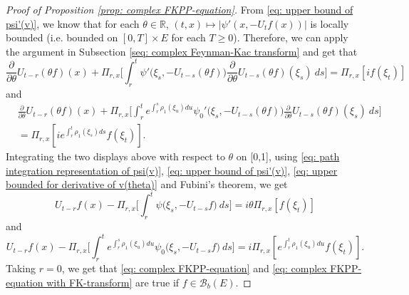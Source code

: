 \documentclass[12pt,a4paper]{amsart}
\theoremstyle{plain}
\theoremstyle{definition}
\numberwithin{equation}{section}
\begin{document}
\begin{proof}[Proof of Proposition \ref{prop: complex FKPP-equation}]
    From \eqref{eq: upper bound of psi'(v)}, we know that for each $\theta\in \mathbb R$, $(t,x) \mapsto |\psi'(x,-U_tf(x))|$ is locally bounded (i.e. bounded on $[0,T]\times E$ for each $T \geq 0$).
    Therefore, we can apply the argument in Subsection \ref{seq: complex Feynman-Kac transform} and get that
\[
    \frac{\partial}{\partial \theta} U_{t-r}(\theta f)(x) + \Pi_{r,x} \Big[\int_r^t \psi'\big(\xi_s,- U_{t-s}(\theta f)\big)\frac{\partial}{\partial \theta} U_{t-s}(\theta f)(\xi_s)~ds\Big]
    = \Pi_{r,x} [i f(\xi_t)]
\]
    and
\begin{equation}\begin{split}
    &\frac{\partial}{\partial \theta} U_{t-r}(\theta f)(x) + \Pi_{r,x} \Big[\int_r^t e^{\int_r^s \rho_1(\xi_u)du}\psi_0'\big(\xi_s,- U_{t-s}(\theta f)\big)\frac{\partial}{\partial \theta} U_{t-s}(\theta f)(\xi_s)~ds\Big]\\
    &= \Pi_{r,x} [i e^{\int_r^t \rho_1(\xi_s)ds}f(\xi_t)].
\end{split}\end{equation}
    Integrating the two displays above with respect to $\theta$  on [0,1], using \eqref{eq: path integration representation of psi(v)}, \eqref{eq: upper bound of psi'(v)}, \eqref{eq: upper bounded for derivative of v(theta)} and Fubini's theorem, we get
\begin{equation}
    U_{t-r}f(x) - \Pi_{r,x} \Big[\int_r^t \psi\big(\xi_s,-U_{t-s}f\big) ~ds\Big]
    = i\theta \Pi_{r,x} [f(\xi_t)]
\end{equation}
    and
\begin{equation}
    U_{t-r}f(x) - \Pi_{r,x} \Big[\int_r^t e^{\int_r^s \rho_1(\xi_u)du} \psi_0\big(\xi_s,- U_{t-s}f\big) ~ds\Big]
    = i\Pi_{r,x} [e^{\int_r^t\rho_1(\xi_u)du}f(\xi_t)].
\end{equation}
    Taking $r = 0$, we get that \eqref{eq: complex FKPP-equation} and \eqref{eq: complex FKPP-equation with FK-transform} are true if $f\in \mathcal B_b(E)$.


\end{proof}
\end{document}

